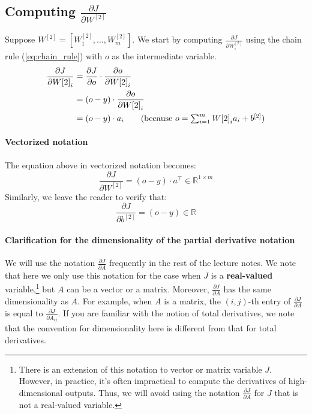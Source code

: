 \subsection{Computing $\frac{\partial J}{\partial W^{[2]}}$}
Suppose $W^{[2]} = [W^{[2]}_1,\ldots,W^{[2]}_m]$. We start by computing
$\frac{\partial J}{\partial W^{[2]}_i}$
using the chain rule (\cref{eq:chain_rule}) with $o$ as the intermediate variable.
\begin{align*}
    \frac{\partial J}{\partial W{[2]}_i} &= \frac{\partial J}{\partial o}\cdot\frac{\partial o}{\partial W{[2]}_i}\\
        &= (o - y) \cdot \frac{\partial o}{\partial W{[2]}_i}\\
        &= (o - y) \cdot a_i \tag{because $o = \sum^m_{i=1} W{[2]}_i a_i + b^{[2]}$}
\end{align*}

\paragraph{Vectorized notation} The equation above in vectorized notation becomes:
\begin{equation}
    \frac{\partial J}{\partial W^{[2]}} = (o - y) \cdot a^\top \in \mathbb{R}^{1 \times m}\label{eq:vectorized_weight_gradient2}
\end{equation}
Similarly, we leave the reader to verify that:
\begin{equation}
    \frac{\partial J}{\partial b^{[2]}} = (o - y) \in \mathbb{R}\label{eq:vectorized_bias_gradient2}
\end{equation}

\paragraph{Clarification for the dimensionality of the partial derivative notation} We
will use the notation $\frac{\partial J}{\partial A}$
frequently in the rest of the lecture notes. We note
that here we only use this notation for the case when $J$ is a \textbf{real-valued}
variable,\footnote{
There is an extension of this notation to vector or matrix variable $J$. However, in practice,
it's often impractical to compute the derivatives of high-dimensional outputs. Thus, we
will avoid using the notation $\frac{\partial J}{\partial A}$
for $J$ that is not a real-valued variable.} but $A$ can be a vector or a matrix. Moreover,
$\frac{\partial J}{\partial A}$ has the same
dimensionality as $A$. For example, when $A$ is a matrix, the $(i,j)$-th entry of
$\frac{\partial J}{\partial A}$
is equal to
$\frac{\partial J}{\partial A_{ij}}$. If you are familiar with the notion of total derivatives,
we note that the convention for dimensionality here is different from that for
total derivatives.

